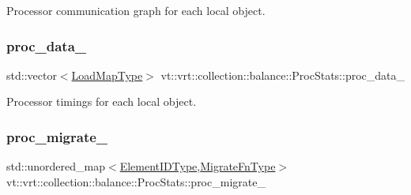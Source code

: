 Processor communication graph for each local object. 

\mbox{\label{structvt_1_1vrt_1_1collection_1_1balance_1_1_proc_stats_a62c01980c4f0eadf09dc29615301234d}} 
\subsubsection{\texorpdfstring{proc\+\_\+data\+\_\+}{proc\_data\_}}
{\footnotesize\ttfamily std\+::vector$<$\hyperlink{structvt_1_1vrt_1_1collection_1_1balance_1_1_proc_stats_aa810fd21680061ec5d50f6526f66be31}{Load\+Map\+Type}$>$ vt\+::vrt\+::collection\+::balance\+::\+Proc\+Stats\+::proc\+\_\+data\+\_\+\hspace{0.3cm}{\ttfamily [private]}}



Processor timings for each local object. 

\mbox{\label{structvt_1_1vrt_1_1collection_1_1balance_1_1_proc_stats_aaf05ac7876d1896f5a640dddbc5a4b60}} 
\subsubsection{\texorpdfstring{proc\+\_\+migrate\+\_\+}{proc\_migrate\_}}
{\footnotesize\ttfamily std\+::unordered\+\_\+map$<$\hyperlink{namespacevt_1_1vrt_1_1collection_1_1balance_a14c8d2c972f2913aa3f1636e5be0a120}{Element\+I\+D\+Type},\hyperlink{structvt_1_1vrt_1_1collection_1_1balance_1_1_proc_stats_a7cb065ac4de218cb717bc2634782f0cb}{Migrate\+Fn\+Type}$>$ vt\+::vrt\+::collection\+::balance\+::\+Proc\+Stats\+::proc\+\_\+migrate\+\_\+\hspace{0.3cm}{\ttfamily [private]}}



